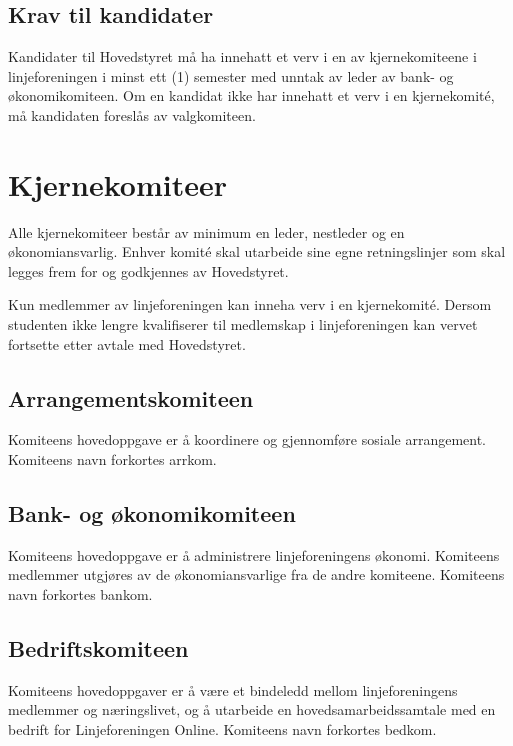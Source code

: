 \subsection{Krav til kandidater}{
Kandidater til Hovedstyret må ha innehatt et verv i en av kjernekomiteene i linjeforeningen i minst ett (1) semester med unntak av leder av bank- og økonomikomiteen. Om en kandidat ikke har innehatt et verv i en kjernekomité, må kandidaten foreslås av valgkomiteen.
}



\section{Kjernekomiteer}
\label{sec:komiteer}
\vspace{23pt}

Alle kjernekomiteer består av minimum en leder, nestleder og en økonomiansvarlig. Enhver komité skal utarbeide sine egne retningslinjer som skal legges frem for og godkjennes av Hovedstyret. \newline
							
Kun medlemmer av linjeforeningen kan inneha verv i en kjernekomité. Dersom studenten ikke lengre kvalifiserer til medlemskap i linjeforeningen kan vervet fortsette etter avtale med Hovedstyret. 

\vspace{-10pt}
\subsection{Arrangementskomiteen}{
Komiteens hovedoppgave er å koordinere og gjennomføre sosiale arrangement. Komiteens navn forkortes arrkom.

}

\vspace{-10pt}
\subsection{Bank- og økonomikomiteen}{
Komiteens hovedoppgave er å administrere linjeforeningens økonomi. Komiteens medlemmer utgjøres av de økonomiansvarlige fra de andre komiteene. Komiteens navn forkortes bankom.

}

\vspace{-10pt}
\subsection{Bedriftskomiteen}{
Komiteens hovedoppgaver er å være et bindeledd mellom linjeforeningens medlemmer og næringslivet, og å utarbeide en hovedsamarbeidssamtale med en bedrift for Linjeforeningen Online. Komiteens navn forkortes bedkom.
}

